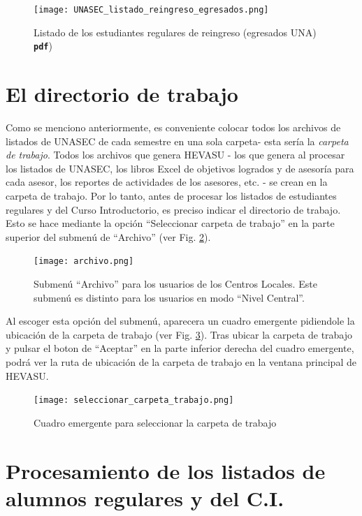 \documentclass[letterpaper,12pt]{book}
\newcommand{\fileformat}[1]{\textbf{\texttt{#1}}}
\begin{document}
\begin{figure}[!ht]
  \centering
  \texttt{[image: UNASEC\_listado\_reingreso\_egresados.png]}
  \caption{Listado de los estudiantes regulares de reingreso (egresados UNA) \fileformat{pdf})}
  \label{fig:reingresosegresados}
\end{figure}

\section{El directorio de trabajo} \label{sec:carpeta_trabajo}

Como se menciono anteriormente, es conveniente colocar todos los archivos de listados de UNASEC de cada semestre en una sola carpeta- esta sería la \emph{carpeta de trabajo}. Todos los archivos que genera HEVASU - los que genera al procesar los listados de UNASEC, los libros Excel de objetivos logrados y de asesoría para cada asesor, los reportes de actividades de los asesores, etc. - se crean en la carpeta de trabajo. Por lo tanto, antes de procesar los listados de estudiantes regulares y del Curso Introductorio, es preciso indicar el directorio de trabajo. Esto se hace mediante la opción ``Seleccionar carpeta de trabajo'' en la parte superior del submenú de ``Archivo'' (ver Fig. \ref{fig:menuarchivo}).

\begin{figure}[!ht]
  \centering
  \texttt{[image: archivo.png]}
  \caption{Submenú ``Archivo'' para los usuarios de los Centros Locales. Este submenú es distinto para los usuarios en modo ``Nivel Central''.}
  \label{fig:menuarchivo}
\end{figure}

Al escoger esta opción del submenú, aparecera un cuadro emergente pidiendole la ubicación de la carpeta de trabajo (ver Fig. \ref{fig:seleccionar_carpeta_trabajo}). Tras ubicar la carpeta de trabajo y pulsar el boton de ``Aceptar'' en la parte inferior derecha del cuadro emergente, podrá ver la ruta de ubicación de la carpeta de trabajo en la ventana principal de HEVASU.

\begin{figure}[!ht]
  \centering
  \texttt{[image: seleccionar\_carpeta\_trabajo.png]}
  \caption{Cuadro emergente para seleccionar la carpeta de trabajo}
  \label{fig:seleccionar_carpeta_trabajo}
\end{figure}

\section{Procesamiento de los listados de alumnos regulares y del C.I.} \label{sec:procesar_listados}
\end{document}
